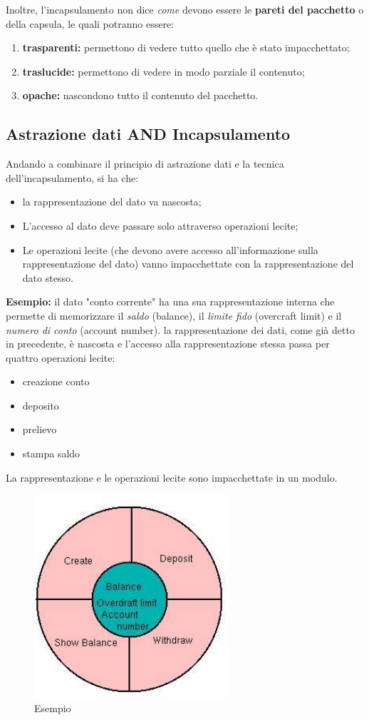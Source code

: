 \documentclass{article}
\begin{document}
	\noindent
	Inoltre, l'incapsulamento non dice \textit{come} devono essere le \textbf{pareti del pacchetto} o della capsula, le quali potranno essere:
	\begin{enumerate}
		\item \textbf{trasparenti:} permettono di vedere tutto quello che è stato impacchettato;
		\item \textbf{traslucide:} permettono di vedere in modo parziale il contenuto;
		\item \textbf{opache:} nascondono tutto il contenuto del pacchetto.
	\end{enumerate}
	
	\subsection{Astrazione dati AND Incapsulamento}
	Andando a combinare il principio di astrazione dati e la tecnica dell'incapsulamento, si ha che:
	\begin{itemize}
		\item la rappresentazione del dato va nascosta;
		\item L'accesso al dato deve passare solo attraverso operazioni lecite;
		\item Le operazioni lecite (che devono avere accesso all'informazione sulla rappresentazione del dato) vanno impacchettate con la rappresentazione del dato stesso.
	\end{itemize}
	\textbf{Esempio:} il dato "conto corrente" ha una sua rappresentazione interna che permette di memorizzare il \textit{saldo} (balance), il \textit{limite fido} (overcraft limit) e il \textit{numero di conto} (account number). la rappresentazione dei dati, come già detto in precedente, è nascosta e l'accesso alla rappresentazione stessa passa per quattro operazioni lecite:
	\begin{itemize}
		\item creazione conto
		\item deposito
		\item prelievo
		\item stampa saldo
	\end{itemize}
	La rappresentazione e le operazioni lecite sono impacchettate in un modulo.
	\begin{figure}[h] %
		\centering
		\includegraphics[width=0.3\linewidth]{assets/immagine3} 
		\caption{Esempio}
		\label{fig:etichetta}
	\end{figure}
	
\end{document}
